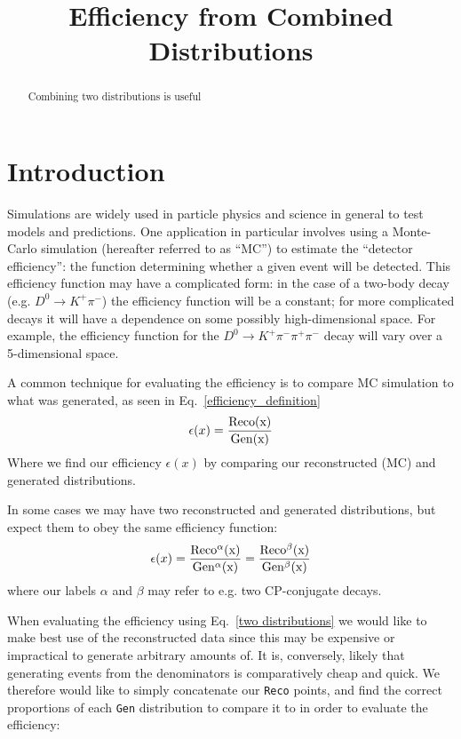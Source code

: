 \documentclass{article}
\title{Efficiency from Combined Distributions}
\begin{document}
\maketitle
\begin{abstract}
    Combining two distributions is useful
\end{abstract}

\section{Introduction}
Simulations are widely used in particle physics and science in general to test models and predictions.
One application in particular involves using a Monte-Carlo simulation (hereafter referred to as ``MC'')
to estimate the ``detector efficiency'': the function determining whether a given event will be detected.
This efficiency function may have a complicated form: in the case of a two-body decay (e.g. $D^0 \rightarrow K^+\pi^-$)
the efficiency function will be a constant; for more complicated decays it will have a dependence on some possibly
high-dimensional space. For example, the efficiency function for the $D^0\rightarrow K^+\pi^-\pi^+\pi^-$ decay will
vary over a 5-dimensional space.

A common technique for evaluating the efficiency is to compare MC simulation to
what was generated, as seen in Eq.~\ref{efficiency_definition}
\begin{equation}
    \epsilon(x) = \frac{\rm{Reco}(x)}{\rm{Gen}(x)}
    \label{efficiency_definition}
\end{equation}
Where we find our efficiency $\epsilon(x)$ by comparing our reconstructed (MC) and generated distributions.

In some cases we may have two reconstructed and generated distributions, but expect them to obey the same
efficiency function:
\begin{equation}
    \epsilon(x) = \frac{\rm{Reco^\alpha}(x)}{\rm{Gen^\alpha}(x)} = \frac{\rm{Reco^\beta}(x)}{\rm{Gen^\beta}(x)}
    \label{two distributions}
\end{equation}
where our labels $\alpha$ and $\beta$ may refer to e.g. two CP-conjugate decays.

When evaluating the efficiency using Eq.~\ref{two distributions} we would like to make best use of the reconstructed data
since this may be expensive or impractical to generate arbitrary amounts of.
It is, conversely, likely that generating events from the denominators is comparatively cheap and quick.
We therefore would like to simply concatenate our \texttt{Reco} points, and find the correct
proportions of each \texttt{Gen} distribution to compare it to in order to evaluate the efficiency:
\end{document}

